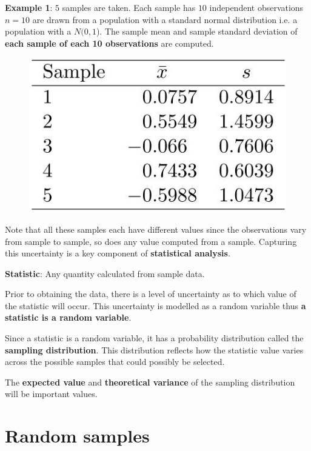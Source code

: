\documentclass[10pt,a4paper]{article}
\begin{document}
\textbf{Example 1}: $5$ samples are taken. Each sample has $10$ independent observations $n = 10$
are drawn from a population with a standard normal distribution i.e. a population with a $N(0, 1$).
The sample mean and sample standard deviation of \textbf{each sample of each 10 observations} are computed.
\begin{figure} [h!]
    \centering
    \includegraphics[scale=0.5]{Samples and observations.JPG}
\end{figure}

Note that all these samples each have diﬀerent values since the observations vary from sample to sample, so does
any value computed from a sample. Capturing this uncertainty is a key component of \textbf{statistical analysis}.

\begin{tcolorbox}[breakable,colback=white]
\textbf{Statistic}: Any quantity calculated from sample data.
\end{tcolorbox}

Prior to obtaining the data, there is a level of uncertainty as to which value of the statistic will
occur. This uncertainty is modelled as a random variable thus \textbf{a statistic is a random
variable}. 

Since a statistic is a random variable, it has a probability distribution called the
\textbf{sampling distribution}. This distribution reﬂects how the statistic value varies across the
possible samples that could possibly be selected.

The \textbf{expected value} and \textbf{theoretical variance} of the sampling distribution will be important values.

\section{Random samples}
\end{document}
